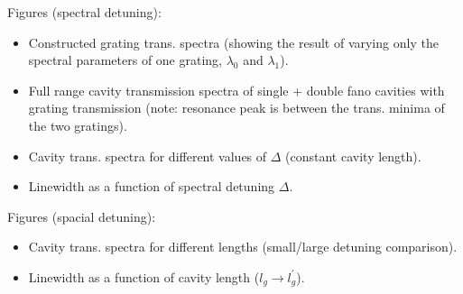 Figures (spectral detuning): 
\begin{itemize}
    \item Constructed grating trans. spectra (showing the result of varying only the spectral parameters of one grating, $\lambda_0$ and $\lambda_1$).
    \item Full range cavity transmission spectra of single + double fano cavities with grating transmission (note: resonance peak is between the trans. minima of the two gratings).
    \item Cavity trans. spectra for different values of $\Delta$ (constant cavity length).
    \item Linewidth as a function of spectral detuning $\Delta$.
\end{itemize}

Figures (spacial detuning):
\begin{itemize}
    \item Cavity trans. spectra for different lengths (small/large detuning comparison).
    \item Linewidth as a function of cavity length ($l_g \rightarrow l_g^{\prime}$).
\end{itemize}
